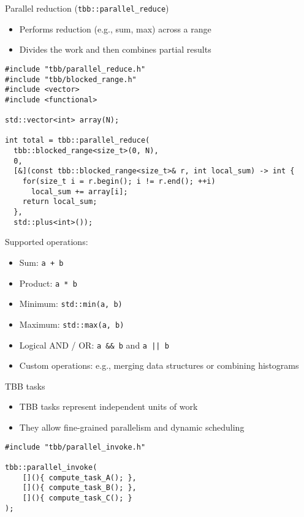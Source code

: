 \documentclass{beamer}
\begin{document}
\begin{frame}[fragile]{Parallel reduction (\texttt{tbb::parallel\_reduce})}
  \begin{itemize}
    \item Performs reduction (e.g., sum, max) across a range
    \item Divides the work and then combines partial results
  \end{itemize}
  \vspace{0.5em}
  \lstset{style=CStyle}
  \begin{lstlisting}
#include "tbb/parallel_reduce.h"
#include "tbb/blocked_range.h"
#include <vector>
#include <functional>

std::vector<int> array(N);

int total = tbb::parallel_reduce(
  tbb::blocked_range<size_t>(0, N),
  0,
  [&](const tbb::blocked_range<size_t>& r, int local_sum) -> int {
    for(size_t i = r.begin(); i != r.end(); ++i)
      local_sum += array[i];
    return local_sum;
  },
  std::plus<int>());
  \end{lstlisting}

  {\tiny
    Supported operations:
    \begin{itemize}
      \item Sum: \texttt{a + b}
      \item Product: \texttt{a * b}
      \item Minimum: \texttt{std::min(a, b)}
      \item Maximum: \texttt{std::max(a, b)}
      \item Logical AND / OR: \texttt{a \&\& b} and \texttt{a || b}
      \item Custom operations: e.g., merging data structures or combining histograms
    \end{itemize}
  }
\end{frame}

\begin{frame}[fragile]{TBB tasks}
  \begin{itemize}
    \item TBB tasks represent independent units of work
    \item They allow fine-grained parallelism and dynamic scheduling
  \end{itemize}
  \vspace{0.5em}
  \lstset{style=CStyle}
  \begin{lstlisting}
#include "tbb/parallel_invoke.h"

tbb::parallel_invoke(
    [](){ compute_task_A(); },
    [](){ compute_task_B(); },
    [](){ compute_task_C(); }
);
  \end{lstlisting}
\end{frame}
\end{document}
